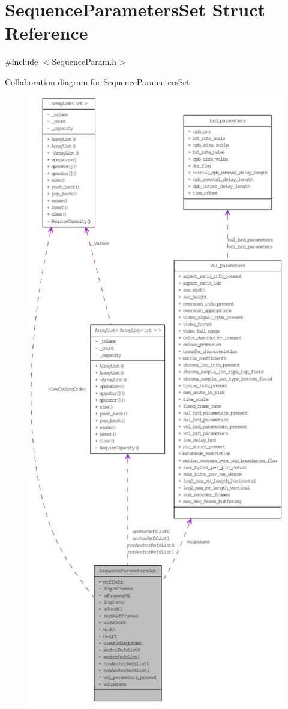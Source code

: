 \hypertarget{struct_sequence_parameters_set}{
\section{SequenceParametersSet Struct Reference}
\label{struct_sequence_parameters_set}
}


{\ttfamily \#include $<$SequenceParam.h$>$}



Collaboration diagram for SequenceParametersSet:\nopagebreak
\begin{figure}[H]
\begin{center}
\leavevmode
\includegraphics[width=400pt]{struct_sequence_parameters_set__coll__graph}

\end{center}
\end{figure}
